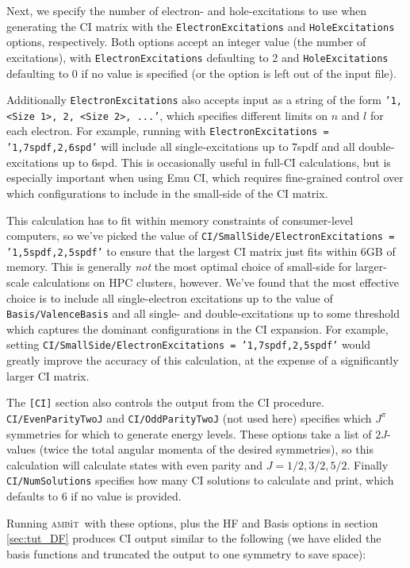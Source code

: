 \documentclass{report}
\newcommand{\ambit}{\textsc{amb}{\footnotesize i}\textsc{t}}
\begin{document}
Next, we specify the number of electron- and hole-excitations to use when generating the CI matrix with
the \texttt{ElectronExcitations} and \texttt{HoleExcitations} options, respectively. Both options accept
an integer value (the number of excitations), with \texttt{ElectronExcitations} defaulting to 2 and
\texttt{HoleExcitations} defaulting to 0 if no value is specified (or the option is left out of the
input file).

Additionally \texttt{ElectronExcitations} also accepts input as a string of the form 
\texttt{'1, <Size 1>, 2, <Size 2>, ...'}, which specifies different limits on $n$ and $l$ for each 
electron. For example, running with \texttt{ElectronExcitations = '1,7spdf,2,6spd'} will include all
single-excitations up to 7spdf and all double-excitations up to 6spd. This is occasionally useful in
full-CI calculations, but is especially important when using Emu CI, which requires fine-grained control
over which configurations to include in the small-side of the CI matrix. 

This calculation has to fit within memory constraints of consumer-level computers, so we've picked the
value of \texttt{CI/SmallSide/ElectronExcitations = '1,5spdf,2,5spdf'} to ensure that the largest CI 
matrix just fits within 6GB of memory. This is generally \emph{not} the most optimal choice of
small-side for larger-scale calculations on HPC clusters, however. We've found that the most effective
choice is to include all single-electron excitations up to the value of \texttt{Basis/ValenceBasis} and
all single- and double-excitations up to some threshold which captures the dominant configurations in
the CI expansion. For example, setting \texttt{CI/SmallSide/ElectronExcitations = '1,7spdf,2,5spdf'}
would greatly improve the accuracy of this calculation, at the expense of a significantly larger CI
matrix.

The \texttt{[CI]} section also controls the output from the CI procedure. \texttt{CI/EvenParityTwoJ} and
\texttt{CI/OddParityTwoJ} (not used here) specifies which $J^{\pi}$ symmetries for which to generate 
energy levels. These options take a list of $2J$-values (twice the total angular momenta of the desired
symmetries), so this calculation will calculate states with even parity and $J = 1/2, 3/2, 5/2$. Finally
\texttt{CI/NumSolutions} specifies how many CI solutions to calculate and print, which defaults to 6 if
no value is provided.

Running \ambit\  with these options, plus the HF and Basis options in section \ref{sec:tut_DF} produces
CI output similar to the following (we have elided the basis functions and truncated the output to one
symmetry to save space):
\end{document}
